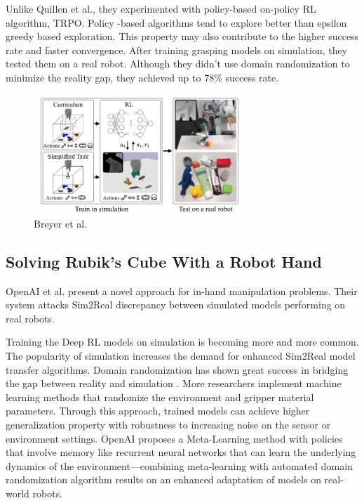 Unlike Quillen et al., they experimented with policy-based on-policy RL algorithm, TRPO. Policy -based algorithms tend to 
explore better than epsilon greedy based exploration. This property may also contribute to the higher success rate and faster convergence. After training grasping models on simulation, they tested them on a real robot. Although they didn’t use domain randomization to minimize the reality gap, they achieved up to \(78\%\) success rate.

\begin{figure}[htbp]
    \centering
    \includegraphics[width=0.7\textwidth]{figures/curriculum}
    \caption{Breyer et al. \cite{Breyer2018}}
    \label{fig:dql}
\end{figure}


\subsection{Solving Rubik's Cube With a Robot Hand}

OpenAI et al. present a novel approach for in-hand manipulation problems. Their system attacks Sim2Real discrepancy between simulated models performing on real robots. 

Training the Deep RL models on simulation is becoming more and more common. The popularity of simulation increases the demand for enhanced Sim2Real model transfer algorithms. Domain randomization has shown great success in bridging the gap between reality and simulation \cite{Tobin2017}. More researchers implement machine learning methods that randomize the environment and gripper material parameters. Through this approach, trained models can achieve higher generalization property with robustness to increasing noise on the sensor or environment settings.
OpenAI proposes a Meta-Learning method with policies that involve memory like recurrent neural networks that can learn the underlying dynamics of the environment—combining meta-learning with automated domain randomization algorithm results on an enhanced adaptation of models on real-world robots.

